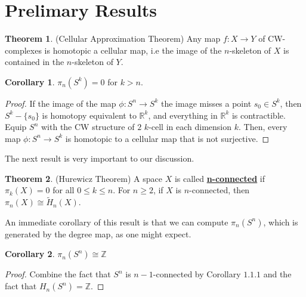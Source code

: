 \documentclass{article}
\theoremstyle{definition}
\newtheorem{theorem}{Theorem}[section]
\theoremstyle{definition}
\theoremstyle{definition}
\theoremstyle{definition}
\theoremstyle{definition}
\theoremstyle{definition}
\newtheorem{corollary}{Corollary}[theorem]
\theoremstyle{definition}
\begin{document}
\section{Prelimary Results}

\begin{tcolorbox}[colback=red!5!white,colframe=red!30!white]
\begin{theorem}
(Cellular Approximation Theorem) Any map $f: X\to Y$ of CW-complexes is homotopic a cellular map, i.e the image of the $n$-skeleton of $X$ is contained in the $n$-skeleton of $Y$.
\end{theorem}
\end{tcolorbox}

\begin{tcolorbox}[colback=green!5!white,colframe=green!30!white]
\begin{corollary}
$\pi_n(S^k)=0$ for $k>n$.
\end{corollary}
\end{tcolorbox}
\begin{proof}
    If the image of the map $\phi: S^n\to S^k$ the image misses a point $s_0\in S^k$, then $S^k-\{s_0\}$ is homotopy equivalent to $\mathbb{R}^{k}$, and everything in $\mathbb{R}^{k}$ is contractible. Equip $S^n$ with the CW structure of $2$ $k$-cell in each dimension $k$. Then, every map $\phi: S^n\to S^k$ is homotopic to a cellular map that is not surjective.
\end{proof}

The next result is very important to our discussion. 

\begin{tcolorbox}[colback=red!5!white,colframe=red!30!white]
\begin{theorem}
(Hurewicz Theorem) A space $X$ is called \underline{\textbf{n-connected}} if $\pi_k(X)=0$ for all $0\leq k\leq n$. For $n\geq 2$, if $X$ is $n$-connected, then $\pi_n(X)\cong \tilde{H}_n(X)$.
\end{theorem}
\end{tcolorbox}
An immediate corollary of this result is that we can compute $\pi_n(S^n)$, which is generated by the degree map, as one might expect.
\begin{tcolorbox}[colback=green!5!white,colframe=green!30!white]
\begin{corollary}
$\pi_n(S^n)\cong \mathbb{Z}$
\end{corollary}
\end{tcolorbox}
\begin{proof}
    Combine the fact that $S^n$ is $n-1$-connected by Corollary $1.1.1$ and the fact that $H_n(S^n)=\mathbb{Z}$.
\end{proof}
\end{document}
